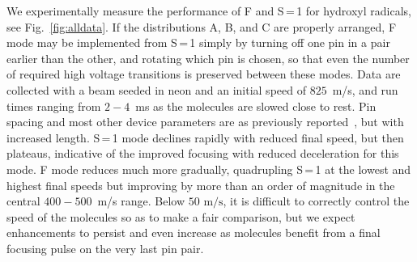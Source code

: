 \documentclass[%
 reprint,
 amsmath,amssymb,
 aps,
prl,
]{revtex4-1}
\begin{document}
We experimentally measure the performance of F and S\,=\,1 for hydroxyl radicals, see Fig.~\ref{fig:alldata}.
If the distributions A, B, and C are properly arranged, F mode may be implemented from S\,=\,1 simply by turning off one pin in a pair earlier than the other, and rotating which pin is chosen, so that even the number of required high voltage transitions is preserved between these modes.
Data are collected with a beam seeded in neon and an initial speed of $825$~m/s, and run times ranging from $2-4$~ms as the molecules are slowed close to rest.
Pin spacing and most other device parameters are as previously reported~\cite{Bochinski2004,Sawyer2007}, but with increased length.
S\,=\,1 mode declines rapidly with reduced final speed, but then plateaus, indicative of the improved focusing with reduced deceleration for this mode.
F mode reduces much more gradually, quadrupling S\,=\,1 at the lowest and highest final speeds but improving by more than an order of magnitude in the central $400-500$~m/s range.
Below $50\text{ m/s}$, it is difficult to correctly control the speed of the molecules so as to make a fair comparison, but we expect enhancements to persist and even increase as molecules benefit from a final focusing pulse on the very last pin pair.
\end{document}
